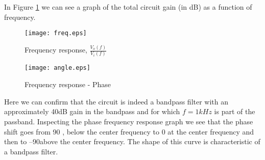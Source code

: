 In Figure \ref{fig:freq_response} we can see a graph of the total circuit gain (in dB) as a function of frequency.


\begin{figure}[H] \centering
\texttt{[image: freq.eps]}
\caption{Frequency response, $\frac{V_o(f)}{V_i(f)}$}
\label{fig:freq_response}
\end{figure}

\begin{figure}[H] \centering
\texttt{[image: angle.eps]}
\caption{Frequency response - Phase}
\label{fig:freq_response_phase}
\end{figure}

Here we can confirm that the circuit is indeed a bandpass filter with an approximately 40dB gain in the bandpass and for which $f = 1 kHz$ is part of the passband. Inspecting the phase frequency response graph we see that the phase shift goes from 90 \degree, below the center frequency to 0 \degree at the center frequency and then to  –90\degree above the center frequency. The shape of this curve is characteristic of a bandpass filter. 





